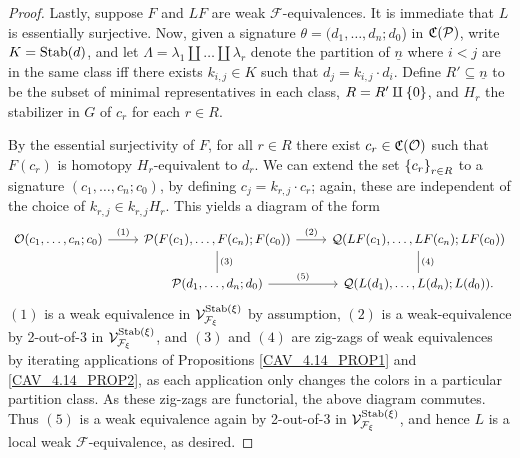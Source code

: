 \documentclass[a4paper,10pt
]{article}%
\renewcommand{\F}{\mathcal F}
\newcommand{\Q}{\mathcal Q}
\renewcommand{\1}{\ensuremath{\mathbb{id}}}
\begin{document}
\begin{proof}
      Lastly, suppose $F$ and $LF$ are weak $\F$-equivalences.
      It is immediate that $L$ is essentially surjective.
      Now, given a signature $\theta = (d_1,\ldots,d_n;d_0$) in $\mathfrak C(\mathcal{P})$, write $K = \mathrm{Stab}(d)$,
      and let $\Lambda = \lambda_1 \amalg \dots \amalg \lambda_r$ denote the partition of $\underline{n}$
      where $i < j$ are in the same class iff there exists $k_{i,j} \in K$ such that $d_j = k_{i,j} \cdot d_i$.
      Define $R' \subseteq \underline{n}$ to be the subset of minimal representatives in each class,
      $R = R' \amalg \left\{0\right\}$,
      and $H_r$ the stabilizer in $G$ of $c_r$ for each $r \in R$.
      
      By the essential surjectivity of $F$, for all $r \in R$ there exist $c_r \in \mathfrak C(\mathcal{O})$ such that
      $F(c_r)$ is homotopy $H_r$-equivalent to $d_r$.
      We can extend the set $\left\{c_r\right\}_{r\in R}$ to a signature $(c_1,\ldots, c_n;c_0)$,
      by defining $c_j = k_{r,j} \cdot c_r$;
      again, these are independent of the choice of $k_{r,j} \in k_{r,j}H_r$.
      This yields a diagram of the form
      \begin{equation}
            \label{TWOOFTHREE_EQ}
            \begin{tikzcd}
                  \O(c_1,\ldots, c_n;c_0) \arrow[r, "(1)"]
                  &
                  \P(F(c_1),\ldots, F(c_n); F(c_0)) \arrow[d,dash, "(3)"] \arrow[r, "(2)"]
                  &
                  \Q(LF(c_1),\ldots, LF(c_n);LF(c_0)) \arrow[d, dash, "(4)"]
                  \\
                  &
                  \P(d_1,\ldots, d_n;d_0) \arrow[r, "(5)"]
                  &
                  \Q(L(d_1),\ldots, L(d_n); L(d_0)).
            \end{tikzcd}
      \end{equation}
      $(1)$ is a weak equivalence in $\V^{\Stab(\ksi)}_{\F_\ksi}$ by assumption,
      $(2)$ is a weak-equivalence by 2-out-of-3 in $\V^{\Stab(\ksi)}_{\F_\ksi}$, and
      $(3)$ and $(4)$ are zig-zags of weak equivalences by iterating applications of
      Propositions \ref{CAV_4.14_PROP1} and \ref{CAV_4.14_PROP2}, %
      as each application only changes the colors in a particular partition class.
      As these zig-zags are functorial, the above diagram commutes.
      Thus $(5)$ is a weak equivalence again by 2-out-of-3 in $\V^{\Stab(\ksi)}_{\F_\ksi}$, and hence
      $L$ is a local weak $\F$-equivalence, as desired.
\end{proof}
\end{document}
